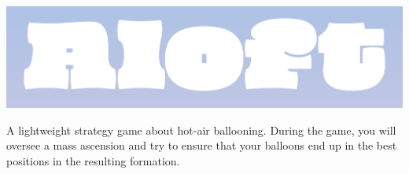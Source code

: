 \documentclass[a5paper, DIV=18, 12pt]{scrartcl}
\begin{document}
\vspace{-1ex}
\begin{center}
\includegraphics[width=\textwidth]{Images/aloft_banner.png}
\end{center}
\vspace{-0.5ex}
A lightweight strategy game about hot-air ballooning. During the game, you will oversee a mass ascension and try to ensure that your balloons end up in the best positions in the resulting formation.
\flushleft
\vspace{-0ex}
\end{document}
